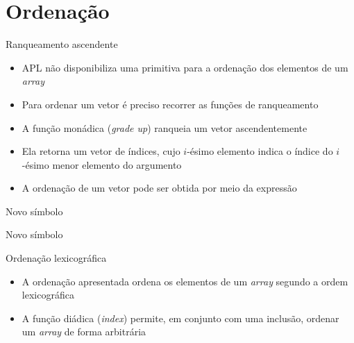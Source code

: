 \section{Ordenação}

\begin{frame}[fragile]{Ranqueamento ascendente}

    \begin{itemize}
        \item APL não disponibiliza uma primitiva para a ordenação dos elementos de um
            \textit{array}

        \item Para ordenar um vetor é preciso recorrer as funções de ranqueamento

        \item A função monádica  (\textit{grade up}) ranqueia um vetor
            ascendentemente

        \item Ela retorna um vetor de índices, cujo $i$-ésimo elemento indica
            o índice do $i$-ésimo menor elemento do argumento

        \item A ordenação de um vetor pode ser obtida por meio da expressão 
    \end{itemize}

\end{frame}

\begin{frame}[fragile]{Novo símbolo}


\end{frame}

\begin{frame}[fragile]{Novo símbolo}


\end{frame}

\begin{frame}[fragile]{Ordenação lexicográfica}

    \begin{itemize}
        \item A ordenação apresentada ordena os elementos de um \textit{array} segundo a ordem
            lexicográfica

        \item A função diádica  (\textit{index}) permite, em conjunto com uma inclusão,
            ordenar um \textit{array} de forma arbitrária
    \end{itemize}

\end{frame}

